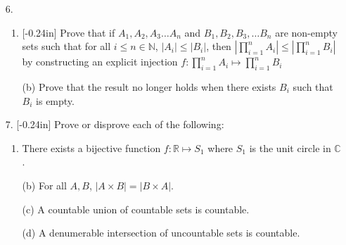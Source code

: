 \documentclass[letterpaper,12pt]{article}
\theoremstyle{definition}
\begin{document}
\pagebreak
\begin{enumerate}
    \item[6.] \begin{enumerate}
        \item \reversemarginpar{}[-0.24in] Prove that if $A_1,A_2,A_3 \ldots A_n$ and $B_1,B_2,B_3,\ldots B_n$ are non-empty sets such that for all $i \leq n \in \mathbb{N}$, $|A_i| \leq |B_i|$, then $|\prod_{i = 1}^n A_i |\leq |\prod_{i = 1}^n B_i |$ by constructing an explicit injection $f: \prod_{i = 1}^n A_i  \mapsto \prod_{i = 1}^n B_i $
    \end{enumerate}
\end{enumerate}
\pagebreak
\begin{enumerate}
    \item[] \begin{enumerate}
        \item[(b)] Prove that the result no longer holds when there exists $B_i$ such that $B_i$ is empty.
    \end{enumerate}
\end{enumerate}
\pagebreak
\begin{enumerate}
    \item[7.] \reversemarginpar{}[-0.24in] Prove or disprove each of the following: \begin{enumerate}
        \item There exists a bijective function $f:\mathbb{R} \mapsto S_1$ where $S_1$ is the unit circle in $\mathbb{C}$.
    \end{enumerate}
\end{enumerate}
\pagebreak
\begin{enumerate}
    \item[] \begin{enumerate}
        \item[(b)] For all $A,B$, $|A \times B| = |B \times A|$.
    \end{enumerate}
\end{enumerate}
\pagebreak
\begin{enumerate}
    \item[] \begin{enumerate}
        \item[(c)] A countable union of countable sets is countable.
    \end{enumerate}
\end{enumerate}
\pagebreak
\begin{enumerate}
    \item[] \begin{enumerate}
        \item[(d)] A denumerable intersection of uncountable sets is countable.
    \end{enumerate}
\end{enumerate}
\end{document}
